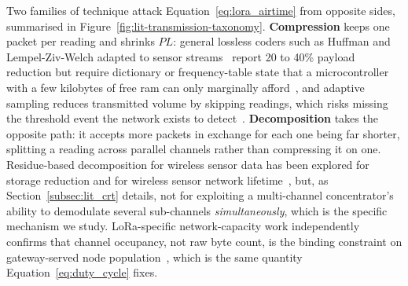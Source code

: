\documentclass[12pt,a4paper,oneside]{book}
\begin{document}
Two families of technique attack Equation~\ref{eq:lora_airtime} from
opposite sides, summarised in Figure~\ref{fig:lit-transmission-taxonomy}.
\textbf{Compression} keeps one packet per reading and shrinks $PL$: general
lossless coders such as Huffman and Lempel-Ziv-Welch adapted to sensor
streams~\cite{li2018lossless, marcelloni2009energy, ziv1977universal, huffman1952method, salomon2007data} report 20 to 40\% payload reduction but
require dictionary or frequency-table state that a microcontroller with a
few kilobytes of free \gls{ram} can only marginally
afford~\cite{chen2025compression, lzw_dictionary_size}, and adaptive
sampling reduces transmitted volume by skipping readings, which risks
missing the threshold event the network exists to
detect~\cite{kjellsson2008adaptive}. \textbf{Decomposition} takes the
opposite path: it accepts more packets in exchange for each one being
far shorter, splitting a reading across parallel channels rather than
compressing it on one. Residue-based decomposition for wireless sensor
data has been explored for storage reduction and for wireless sensor
network lifetime~\cite{vidhya2021crt, khan2023fuzzycrt, rahman2022rnsenergy, djeddi2025parallelCRT}, but, as
Section~\ref{subsec:lit_crt} details, not for exploiting a multi-channel
concentrator's ability to demodulate several sub-channels
\emph{simultaneously}, which is the specific mechanism we study.
LoRa-specific network-capacity work independently confirms that channel
occupancy, not raw byte count, is the binding constraint on
gateway-served node population~\cite{centenaro2016lorawanlimits, zhang2022lorawan, chapungo2025lorawan, bicamumakuba2025lorawan, turlykozhayeva2024proactive, mozambique2021lorawan}, which is the same
quantity Equation~\ref{eq:duty_cycle} fixes.
\end{document}
